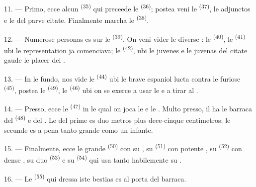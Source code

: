 11. --- Primo, ecce alcun  \textsuperscript{(35)} qui
preceede le  \textsuperscript{(36)}; postea veni le 
\textsuperscript{(37)}, le adjunctos e le  del parve
citate. Finalmente marcha le  \textsuperscript{(38)}.

\VUsaut{5.0mm}
\VUsaut{3.6mm}

12. --- Numerose personas es sur le 
\textsuperscript{(39)}. On veni vider le diverse : le
 \textsuperscript{(40)}, le 
\textsuperscript{(41)} ubi le representation ja comenciava; le  \textsuperscript{(42)}, ubi le juvenes e le juvenas del citate gaude le
placer del .

13. --- In le fundo, nos vide le  \textsuperscript{(44)} ubi le
brave  espaniol lucta contra le furiose 
\textsuperscript{(45)}, postea le 
\textsuperscript{(49)}, le  \textsuperscript{(46)} ubi on
se exerce a usar le  e a tirar al .

14. --- Presso, ecce le  \textsuperscript{(47)} in le
qual on joca le  e le . Multo presso, il ha le
barraca del  \textsuperscript{(48)} e del . Le
 del prime es duo metros plus dece-cinque centimetros; le
secunde es a pena tanto grande como un infante.

15. --- Finalmente, ecce le grande  \textsuperscript{(50)} con
su , su  \textsuperscript{(51)} con
potente , su  \textsuperscript{(52)} con dense
, su duo  \textsuperscript{(53)} e su
 \textsuperscript{(54)} qui usa tanto habilemente su
.

16. --- Le  \textsuperscript{(55)} qui dressa iste bestias es al
porta del barraca.
\VUsaut{6.0mm}
\VUfilet{22mm}
